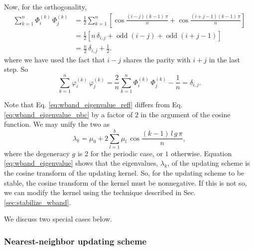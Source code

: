 \documentclass[reprint, floatfix]{revtex4-1}
\begin{document}
{  Now, for the orthogonality,
  $$
  \begin{aligned}
    \sum_{k = 1}^n
    \Phi^{(k)}_i \, \Phi^{(k)}_j
    &=
    \frac 1 2
    \sum_{k = 1}^n
    \left[
      \cos \tfrac{ (i - j) (k - 1) \, \pi }
                 {         n              }
      +
      \cos \tfrac{ (i + j - 1) (k - 1) \, \pi }
                 {             n              }
    \right]
    \\
    &=
    \frac 1 2
    \left[
      n \, \delta_{i, j}
      +
      \operatorname{odd}(i - j)
      +
      \operatorname{odd}(i + j - 1)
    \right]
    \\
    &=
    \frac n 2 \, \delta_{i, j}
    + \frac 1 2.
  \end{aligned}
  $$
  where we have used the fact
  that $i - j$ shares the parity with $i + j$
  in the last step.
  So
  $$
    \sum_{k = 1}^n
    \varphi^{(k)}_i \, \varphi^{(k)}_j
    =
    \frac 2 n
    \sum_{k = 1}^n
    \Phi^{(k)}_i \, \Phi^{(k)}_j
    -
    \frac 1 n
    =
    \delta_{i, j}.
  $$
}
%


Note that Eq. \eqref{eq:wband_eigenvalue_refl}
differs from Eq. \eqref{eq:wband_eigenvalue_pbc}
by a factor of $2$
in the argument of the cosine function.
%
We may unify the two as
%
\begin{equation}
  \lambda_k
  =
  \mu_0
  +
  2
  \sum_{ l = 1 }^b
    \mu_l \,
    \cos \frac{ (k - 1) \, l \, g \, \pi }
              {            n             }
  ,
  \label{eq:wband_eigenvalue}
\end{equation}
%
where the degeneracy $g$ is $2$
for the periodic case,
or $1$ otherwise.
%
Equation \eqref{eq:wband_eigenvalue}
shows that the eigenvalues, $\lambda_k$,
of the updating scheme
is the cosine transform of
the updating kernel.
%
So, for the updating scheme to be stable,
the cosine transform of the kernel
must be nonnegative.
%
If this is not so,
we can modify the kernel
using the technique described
in Sec. \ref{sec:stabilize_wband}.

We discuss two special cases below.



\subsubsection{\label{sec:nnscheme}
Nearest-neighbor updating scheme}
\end{document}
